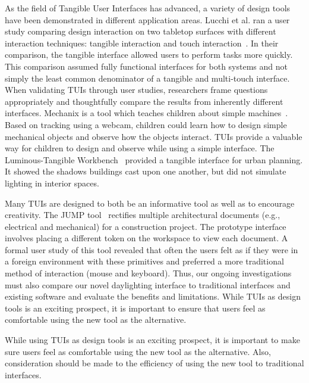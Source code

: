 \documentclass[review]{vgtc}                 %
\begin{document}
As the field of Tangible User Interfaces has advanced, a variety of
design tools have been demonstrated in different application areas.
Lucchi et al. ran a user study comparing design interaction on two
tabletop surfaces with different interaction techniques: tangible
interaction and touch interaction~\cite{1709917}.  In their
comparison, the tangible interface allowed users to perform tasks more
quickly.  This comparison assumed fully functional interfaces for both
systems and not simply the least common denominator of a tangible and
multi-touch interface.  When validating TUIs through user studies,
researchers frame questions appropriately and thoughtfully compare
the results from inherently different interfaces.  Mechanix is a tool
which teaches children about simple machines~\cite{TsengBB11}.  Based
on tracking using a webcam, children could learn how to design simple
mechanical objects and observe how the objects interact.  TUIs provide
a valuable way for children to design and observe while using a simple
interface.  The Luminous-Tangible Workbench~\cite{Urp99urp:a}
provided a tangible interface for urban planning.  It showed the
shadows buildings cast upon one another, but did not simulate lighting
in interior spaces.

Many TUIs are designed to both be an informative tool as well as to
encourage creativity.  The JUMP tool~\cite{1268540} rectifies multiple
architectural documents (e.g., electrical and mechanical) for a
construction project.  The prototype interface involves placing a
different token on the workspace to view each document.  A formal user
study of this tool revealed that often the users felt as if they were
in a foreign environment with these primitives and preferred a more
traditional method of interaction (mouse and keyboard).  Thus, our
ongoing investigations must also compare our novel daylighting
interface to traditional interfaces and existing software and evaluate
the benefits and limitations.  While TUIs as design tools is an
exciting prospect, it is important to ensure that users feel as
comfortable using the new tool as the alternative.


While using TUIs as design tools is an exciting prospect, it is
important to make sure users feel as comfortable using the new tool as
the alternative.  Also, consideration should be made to the efficiency
of using the new tool to traditional interfaces.

\end{document}
